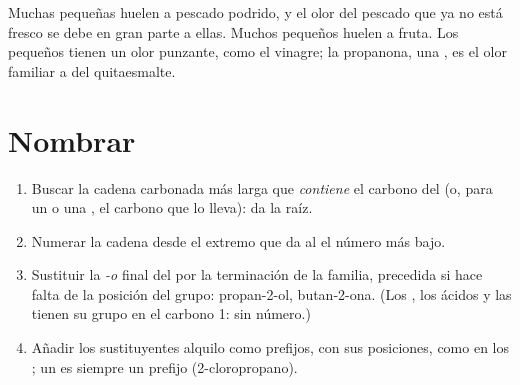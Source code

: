 \begin{remark}\label{rem:g11:functional-groups:smells}
Muchas  pequeñas huelen a pescado podrido, y el olor del pescado
que ya no está fresco se debe en gran parte a ellas. Muchos 
pequeños huelen a fruta. Los  pequeños tienen un olor
punzante, como el vinagre; la propanona, una , es el olor familiar
a  del quitaesmalte.
\end{remark}

\section{Nombrar}

\begin{method}\label{met:g11:functional-groups:naming}
\begin{enumerate}
  \item Buscar la cadena carbonada más larga que \emph{contiene} el
        carbono del  (o, para un  o una , el
        carbono que lo lleva): da la raíz.
  \item Numerar la cadena desde el extremo que da al  el
        número más bajo.
  \item Sustituir la \emph{-o} final del  por la terminación de la
        familia, precedida si hace falta de la posición del grupo:
        propan-2-ol, butan-2-ona. (Los , los ácidos y las
         tienen su grupo en el carbono 1: sin número.)
  \item Añadir los sustituyentes alquilo como prefijos, con sus
        posiciones, como en los ; un  es siempre un
        prefijo (2-cloropropano).
\end{enumerate}
\end{method}

